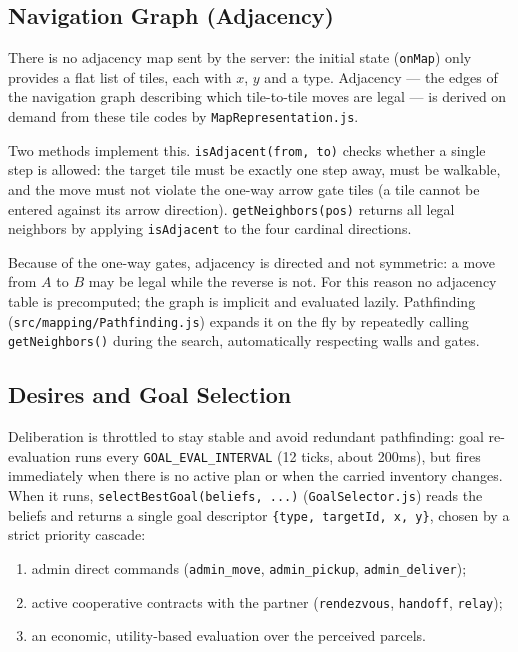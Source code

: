 \documentclass[a4paper,11pt]{article}
\begin{document}
\subsection{Navigation Graph (Adjacency)}

There is no adjacency map sent by the server: the initial state (\texttt{onMap})
only provides a flat list of tiles, each with $x$, $y$ and a type. Adjacency --- the
edges of the navigation graph describing which tile-to-tile moves are legal --- is
derived on demand from these tile codes by \texttt{MapRepresentation.js}.

Two methods implement this. \texttt{isAdjacent(from, to)} checks whether a single
step is allowed: the target tile must be exactly one step away, must be walkable,
and the move must not violate the one-way arrow gate tiles (a tile cannot be entered
against its arrow direction). \texttt{getNeighbors(pos)} returns all legal neighbors
by applying \texttt{isAdjacent} to the four cardinal directions.

Because of the one-way gates, adjacency is directed and not symmetric: a move from
$A$ to $B$ may be legal while the reverse is not. For this reason no adjacency table
is precomputed; the graph is implicit and evaluated lazily. Pathfinding
(\texttt{src/mapping/Pathfinding.js}) expands it on the fly by repeatedly calling
\texttt{getNeighbors()} during the search, automatically respecting walls and gates.

\subsection{Desires and Goal Selection}

Deliberation is throttled to stay stable and avoid redundant pathfinding: goal
re-evaluation runs every \texttt{GOAL\_EVAL\_INTERVAL} (12 ticks, about 200ms), but
fires immediately when there is no active plan or when the carried inventory
changes. When it runs, \texttt{selectBestGoal(beliefs, ...)}
(\texttt{GoalSelector.js}) reads the beliefs and returns a single goal descriptor
\texttt{\{type, targetId, x, y\}}, chosen by a strict priority cascade:

\begin{enumerate}
  \item admin direct commands (\texttt{admin\_move},
        \texttt{admin\_pickup}, \texttt{admin\_deliver});
  \item active cooperative contracts with the partner
        (\texttt{rendezvous}, \texttt{handoff}, \texttt{relay});
  \item an economic, utility-based evaluation over the perceived parcels.
\end{enumerate}
\end{document}
